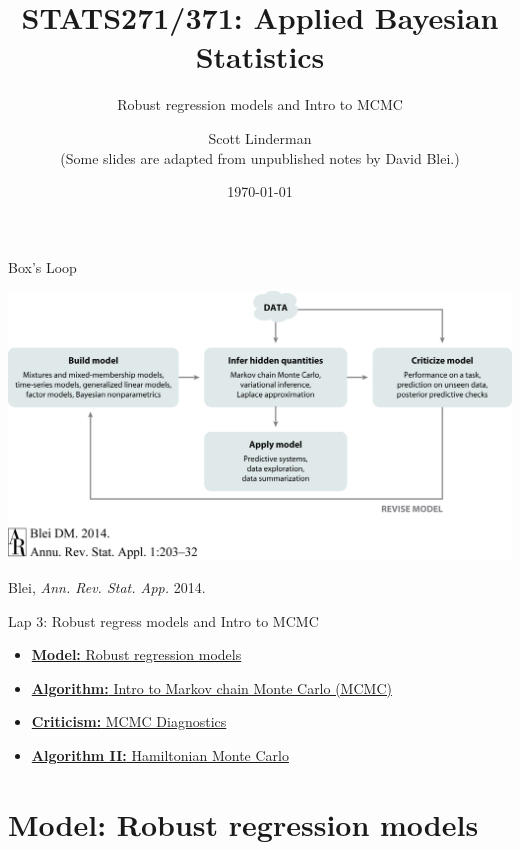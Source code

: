 \documentclass[aspectratio=169]{beamer}
\title{STATS271/371: Applied Bayesian Statistics}
\subtitle{Robust regression models and Intro to MCMC}
\author{Scott Linderman
\\
{\footnotesize (Some slides are adapted from unpublished notes by David Blei.)}}
\date{\today}
\begin{document}
\maketitle


\begin{frame}{Box's Loop}
\begin{center}
\includegraphics[width=.85\linewidth]{figures/lap1/boxsloop.jpeg}\\
\end{center} 
\begin{flushright}
{\footnotesize Blei, \textit{Ann. Rev. Stat. App.} 2014.}
\end{flushright}
\end{frame}

\begin{frame}{Lap 3: Robust regress models and Intro to MCMC}
\begin{itemize}
    \item \hyperref[sec:robust_regression]{\textbf{Model:} Robust regression models}
    \item \hyperref[sec:intro_mcmc]{\textbf{Algorithm:} Intro to Markov chain Monte Carlo (MCMC)}
    \item \hyperref[sec:diagnostics]{\textbf{Criticism:} MCMC Diagnostics}
    \item \hyperref[sec:hmc]{\textbf{Algorithm II:} Hamiltonian Monte Carlo}
\end{itemize}
\end{frame}


\section{Model: Robust regression models}
\label{sec:robust_regression}
\end{document}
